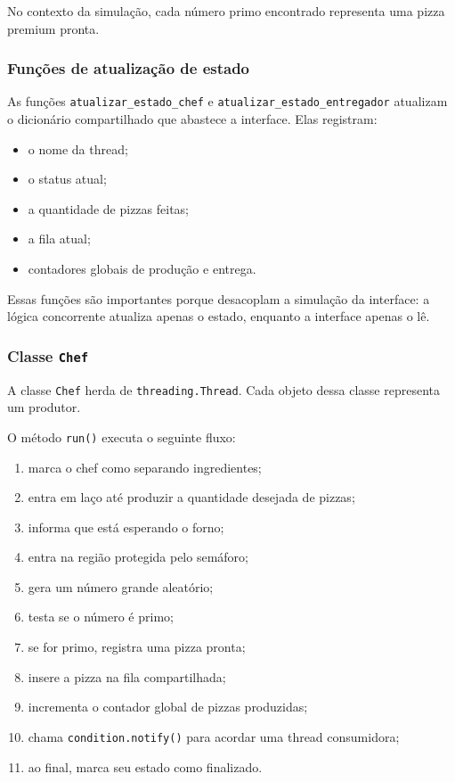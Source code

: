 \documentclass[12pt,a4paper]{article}
\begin{document}
No contexto da simula\c{c}\~ao, cada n\'umero primo encontrado representa uma pizza premium pronta.

\subsubsection{Fun\c{c}\~oes de atualiza\c{c}\~ao de estado}
As fun\c{c}\~oes \texttt{atualizar\_estado\_chef} e \texttt{atualizar\_estado\_entregador} atualizam o dicion\'ario compartilhado que abastece a interface. Elas registram:
\begin{itemize}
    \item o nome da thread;
    \item o status atual;
    \item a quantidade de pizzas feitas;
    \item a fila atual;
    \item contadores globais de produ\c{c}\~ao e entrega.
\end{itemize}

Essas fun\c{c}\~oes s\~ao importantes porque desacoplam a simula\c{c}\~ao da interface: a l\'ogica concorrente atualiza apenas o estado, enquanto a interface apenas o l\^e.

\subsubsection{Classe \texttt{Chef}}
A classe \texttt{Chef} herda de \texttt{threading.Thread}. Cada objeto dessa classe representa um produtor.

O m\'etodo \texttt{run()} executa o seguinte fluxo:
\begin{enumerate}
    \item marca o chef como separando ingredientes;
    \item entra em la\c{c}o at\'e produzir a quantidade desejada de pizzas;
    \item informa que est\'a esperando o forno;
    \item entra na regi\~ao protegida pelo sem\'aforo;
    \item gera um n\'umero grande aleat\'orio;
    \item testa se o n\'umero \'e primo;
    \item se for primo, registra uma pizza pronta;
    \item insere a pizza na fila compartilhada;
    \item incrementa o contador global de pizzas produzidas;
    \item chama \texttt{condition.notify()} para acordar uma thread consumidora;
    \item ao final, marca seu estado como finalizado.
\end{enumerate}
\end{document}
